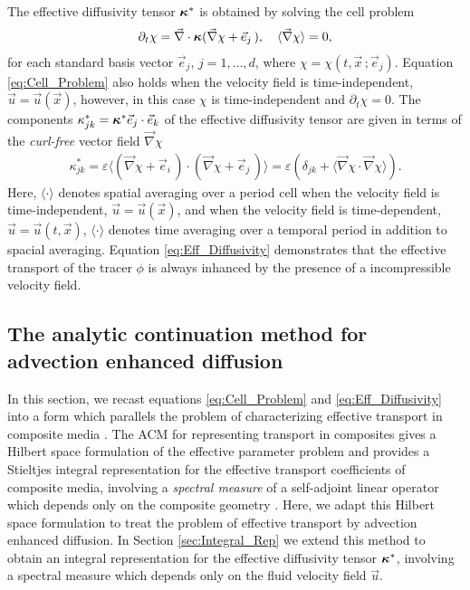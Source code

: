 \documentclass[11pt]{amsart}
\newcommand{\Hb}{\mathbf{H}}
\newcommand{\Ib}{\mathbf{I}}
\newcommand\bkappa{\mbox{\boldmath${\kappa}$}}
\begin{document}
The effective diffusivity tensor $\bkappa^*$ is
obtained by solving the cell problem \cite{Fannjiang:SIAM_JAM:333}
%
\begin{align}\label{eq:Cell_Problem}
  \partial_t\chi=\vec{\nabla}\cdot\bkappa(\vec{\nabla}\chi+\vec{e}_j\,), \quad
  \langle\vec{\nabla}\chi\rangle=0,
\end{align}
%
for each standard basis vector $\vec{e}_j$, $j=1,\ldots,d$, where
$\chi=\chi(t,\vec{x}\,;\vec{e}_j)$. Equation \eqref{eq:Cell_Problem} also holds
\cite{Fannjiang:SIAM_JAM:333} when the velocity field is
time-independent, $\vec{u}=\vec{u}(\vec{x})$, however, in this case $\chi$ 
is time-independent and $\partial_t\chi=0$.  The 
components $\kappa^*_{jk}=\bkappa^*\vec{e}_j\cdot\vec{e}_k$ of the effective
diffusivity tensor are given in terms of the \emph{curl-free} vector
field $\vec{\nabla}\chi$ \cite{Fannjiang:SIAM_JAM:333} 
% 
\begin{align}\label{eq:Eff_Diffusivity}  
   \kappa^*_{jk}=\varepsilon\langle(\vec{\nabla}\chi+\vec{e}_i\,)\cdot(\vec{\nabla}\chi+\vec{e}_j\,)\rangle
       =\varepsilon(\delta_{jk}+\langle\vec{\nabla}\chi\cdot\vec{\nabla}\chi\rangle).
\end{align}
Here, $\langle\cdot\rangle$ denotes spatial averaging over a period cell when the
velocity field is time-independent, $\vec{u}=\vec{u}(\vec{x})$, and
when the velocity field is time-dependent, $\vec{u}=\vec{u}(t,\vec{x})$,
$\langle\cdot\rangle$ denotes time averaging over a temporal period in addition to
spacial averaging. Equation \eqref{eq:Eff_Diffusivity} demonstrates
that the effective transport of the tracer $\phi$ is always inhanced by the
presence of a incompressible velocity field. 




\subsection{The analytic continuation method for advection enhanced 
  diffusion} \label{sec:ACM} 
%
In this section, we recast equations \eqref{eq:Cell_Problem} and
\eqref{eq:Eff_Diffusivity} into a form which parallels the problem of
characterizing effective transport in composite media
\cite{Golden:CMP-473}. The ACM for representing transport in
composites gives a Hilbert space formulation of the effective
parameter problem and provides a Stieltjes integral representation
for the effective transport coefficients of composite media, involving
a \emph{spectral measure} of a self-adjoint linear operator which
depends only on the composite geometry
\cite{Golden:CMP-473,Murphy:JMP:063506,MILTON:2002:TC}. Here, we adapt
this Hilbert space formulation to treat the problem of effective
transport by advection enhanced diffusion. In Section
\ref{sec:Integral_Rep} we extend this method to obtain an integral
representation for the effective diffusivity tensor $\bkappa^*$,
involving a spectral measure which depends only on the fluid velocity
field $\vec{u}$. 
\end{document}

